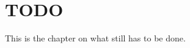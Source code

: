 \documentclass[MachineLearning]{subfiles}
\begin{document}
\section{TODO}
This is the chapter on what still has to be done.
\end{document}
